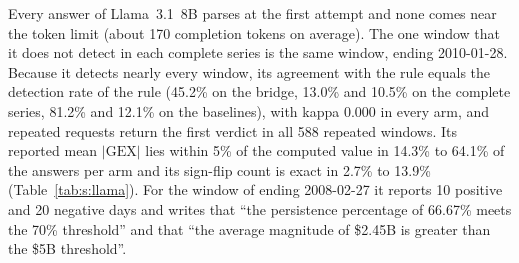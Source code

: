 Every answer of Llama~3.1~8B parses at the first attempt and none comes near the token limit (about 170 completion tokens on average). The one window that it does not detect in each complete series is the same window, ending 2010-01-28. Because it detects nearly every window, its agreement with the rule equals the detection rate of the rule (45.2\% on the bridge, 13.0\% and 10.5\% on the complete series, 81.2\% and 12.1\% on the baselines), with kappa 0.000 in every arm, and repeated requests return the first verdict in all 588 repeated windows. Its reported mean $|\mathrm{GEX}|$ lies within 5\% of the computed value in 14.3\% to 64.1\% of the answers per arm and its sign-flip count is exact in 2.7\% to 13.9\% (Table~\ref{tab:s:llama}). For the window of  ending 2008-02-27 it reports 10 positive and 20 negative days and writes that ``the persistence percentage of 66.67\% meets the 70\% threshold'' and that ``the average magnitude of \$2.45B is greater than the \$5B threshold''.

